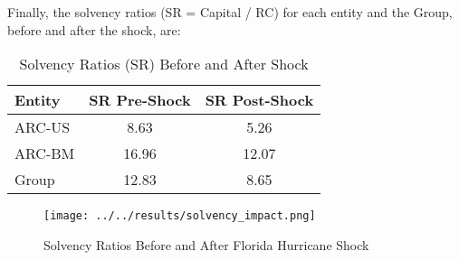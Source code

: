 Finally, the solvency ratios (SR = Capital / RC) for each entity and the Group, before and after the shock, are:

\begin{table}[h!]
\centering
\caption{Solvency Ratios (SR) Before and After Shock}
\label{tab:sr_before_after}
\begin{tabular}{|l|c|c|}
\hline
\textbf{Entity} & \textbf{SR Pre-Shock} & \textbf{SR Post-Shock} \\
\hline
ARC-US & 8.63 & 5.26 \\
ARC-BM & 16.96 & 12.07 \\
Group & 12.83 & 8.65 \\
\hline
\end{tabular}
\end{table}

\begin{figure}[h!]
    \centering
    \texttt{[image: ../../results/solvency\_impact.png]}
    \caption{Solvency Ratios Before and After Florida Hurricane Shock}
    \label{fig:solvency_impact}
\end{figure}